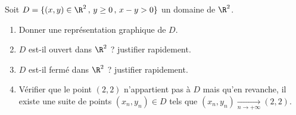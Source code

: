 \titre{}
\auteur{}

Soit $D = \{(x,y) \in \R^2 \, , \, y \geq 0 \, , \, x-y > 0\}$ un domaine de $\R^2$.  
\begin{enumerate}
	\item Donner une représentation graphique de $D$. 
	\item $D$ est-il ouvert dans $\R^2$ ? justifier rapidement. 
	\item $D$ est-il fermé dans $\R^2$ ? justifier rapidement. 
	\item Vérifier que le point $(2,2)$ n'appartient pas à $D$ mais qu'en revanche, il existe une suite de points $(x_n,y_n) \in D$ tels que $(x_n,y_n) \xrightarrow[n \to +\infty]{} (2,2)$.
\end{enumerate}